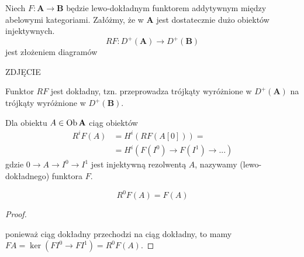 \begin{definition}
  Niech $F:\mathbf{A}\to\mathbf{B}$ będzie lewo-dokładnym funktorem addytywnym między abelowymi kategoriami. Załóżmy, że w $\mathbf{A}$ jest dostatecznie dużo obiektów injektywnych. 
  $$RF:D^+(\mathbf{A})\to D^+(\mathbf{B})$$
  jest złożeniem diagramów
  \begin{center}\end{center}
  {\large\color{red}ZDJĘCIE}
\end{definition}

\begin{fact}
  Funktor $RF$ jest dokładny, tzn. przeprowadza trójkąty wyróżnione w $D^+(\mathbf{A})$ na trójkąty wyróżnione w $D^+(\mathbf{B})$.
\end{fact}

\begin{definition}
  Dla obiektu $A\in\operatorname{Ob}\mathbf{A}$ ciąg obiektów
  \begin{align*}
    R^iF(A)&=H^i(RF(A[0]))=\\ 
           &=H^i(F(I^0)\to F(I^1)\to ...)
  \end{align*}
  gdzie $0\to A\to I^0\to I^1$ jest injektywną rezolwentą $A$, nazywamy  (lewo-dokładnego) funktora $F$.
\end{definition}

\begin{uwaga}
  $$R^0F(A)=F(A)$$
\end{uwaga}

\begin{proof}
  \begin{center}\end{center}
  ponieważ ciąg dokładny przechodzi na ciąg dokładny, to mamy $FA=\ker (FI^0\to FI^1)=R^0F(A)$.
\end{proof}

